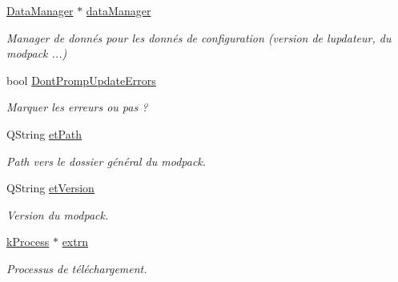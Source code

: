 \begin{DoxyCompactItemize}
\mbox{\label{classmainWindow_a1f78658a7c3422e891307f94b3fb91a2}} 
\hyperlink{classDataManager}{Data\+Manager} $\ast$ \hyperlink{classmainWindow_a1f78658a7c3422e891307f94b3fb91a2}{data\+Manager}
\begin{DoxyCompactList}\small\item\em Manager de donnés pour les donnés de configuration (version de l\textquotesingle{}updateur, du modpack ...) \end{DoxyCompactList}\item 
\mbox{\label{classmainWindow_ad4ea46f5179a7059dd640d6e16b8d130}} 
bool \hyperlink{classmainWindow_ad4ea46f5179a7059dd640d6e16b8d130}{Dont\+Promp\+Update\+Errors}
\begin{DoxyCompactList}\small\item\em Marquer les erreurs ou pas ? \end{DoxyCompactList}\item 
\mbox{\label{classmainWindow_a586234d31340f9a0dbf0b6ba8b090325}} 
Q\+String \hyperlink{classmainWindow_a586234d31340f9a0dbf0b6ba8b090325}{et\+Path}
\begin{DoxyCompactList}\small\item\em Path vers le dossier général du modpack. \end{DoxyCompactList}\item 
\mbox{\label{classmainWindow_aad569ebc4a020a221a941751f9acc95f}} 
Q\+String \hyperlink{classmainWindow_aad569ebc4a020a221a941751f9acc95f}{et\+Version}
\begin{DoxyCompactList}\small\item\em Version du modpack. \end{DoxyCompactList}\item 
\mbox{\label{classmainWindow_ad8b61699b387e89a54c46cc2159c4346}} 
\hyperlink{classkProcess}{k\+Process} $\ast$ \hyperlink{classmainWindow_ad8b61699b387e89a54c46cc2159c4346}{extrn}
\begin{DoxyCompactList}\small\item\em Processus de téléchargement. \end{DoxyCompactList}\item 
\mbox{\label{classmainWindow_a22d779eb0b5a74e95f179e6bb4585114}} 

\end{DoxyCompactItemize}

